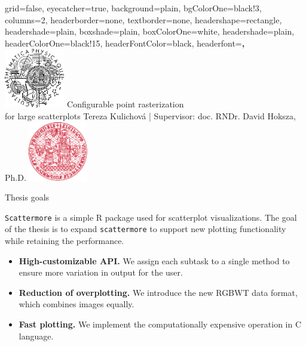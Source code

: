 \documentclass[portrait,a0paper,fontscale=0.26]{baposter}
\begin{document}
\color{black!80} %
\begin{poster}{grid=false,
	eyecatcher=true,
	background=plain,
	bgColorOne=black!3, %
	columns=2,
	headerborder=none,
	textborder=none,
	headershape=rectangle,
	headershade=plain,
	boxshade=plain,
	boxColorOne=white,
	headershade=plain,
	headerColorOne=black!15, %
	headerFontColor=black,
    headerfont=\bfseries\Large,
	}%
	{\includegraphics[height=7em]{logos/mff-black.pdf}}
	{Configurable point rasterization\\for large scatterplots}
	{\vspace{1.5ex} Tereza Kulichová | Supervisor: doc. RNDr. David Hoksza, Ph.D.}
	{\includegraphics[height=7em]{logos/uk-red.pdf}}


%
%

\begin{posterbox}[column=0,name=background,
headerColorOne=green!50!black, boxColorOne=green!10, headerFontColor=white]{Thesis goals}

\texttt{Scattermore} is a simple R package used for scatterplot visualizations. The goal of the thesis is to expand \texttt{scattermore} to support new plotting functionality while retaining the performance.

\begin{itemize}
\item \textbf{High-customizable API.} We assign each subtask to a single method to ensure more variation in output for the user.
\item \textbf{Reduction of overplotting.} We introduce the new RGBWT data format, which combines images equally.
\item \textbf{Fast plotting.} We implement the computationally expensive operation in C language.
\end{itemize}
\end{posterbox}


\end{poster}
\end{document}
